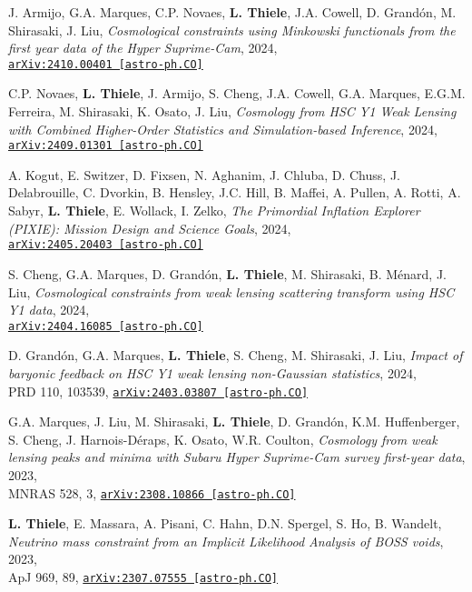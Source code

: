 J. Armijo, G.A. Marques, C.P. Novaes, {\bf L. Thiele}, J.A. Cowell, D. Grand\'on,
M. Shirasaki, J. Liu,
\emph{Cosmological constraints using Minkowski functionals from the first year
data of the Hyper Suprime-Cam}, 2024,\\
\href{https://arxiv.org/abs/2410.00401}{\mbox{\texttt{arXiv:2410.00401 [astro-ph.CO]}}}

C.P. Novaes, {\bf L. Thiele}, J. Armijo, S. Cheng, J.A. Cowell, G.A. Marques, E.G.M. Ferreira,
M. Shirasaki, K. Osato, J. Liu,
\emph{Cosmology from HSC Y1 Weak Lensing with Combined Higher-Order Statistics and
Simulation-based Inference}, 2024,\\
\href{https://arxiv.org/abs/2409.01301}{\mbox{\texttt{arXiv:2409.01301 [astro-ph.CO]}}}

A. Kogut, E. Switzer, D. Fixsen, N. Aghanim, J. Chluba, D. Chuss, J. Delabrouille,
C. Dvorkin, B. Hensley, J.C. Hill, B. Maffei, A. Pullen, A. Rotti, A. Sabyr,
{\bf L. Thiele}, E. Wollack, I. Zelko,
\emph{The Primordial Inflation Explorer (PIXIE): Mission Design and Science Goals}, 2024,\\
\href{https://arxiv.org/abs/2405.20403}{\mbox{\texttt{arXiv:2405.20403 [astro-ph.CO]}}}

S. Cheng, G.A. Marques, D. Grand\'on, {\bf L. Thiele}, M. Shirasaki, B. M\'enard, J. Liu,
\emph{Cosmological constraints from weak lensing scattering transform using HSC Y1 data}, 2024,\\
\href{https://arxiv.org/abs/2404.16085}{\mbox{\texttt{arXiv:2404.16085 [astro-ph.CO]}}}

D. Grand\'on, G.A. Marques, {\bf L. Thiele}, S. Cheng, M. Shirasaki, J. Liu,
\emph{Impact of baryonic feedback on HSC Y1 weak lensing non-Gaussian statistics}, 2024,\\
PRD 110, 103539,
\href{https://arxiv.org/abs/2403.03807}{\mbox{\texttt{arXiv:2403.03807 [astro-ph.CO]}}}

G.A. Marques, J. Liu, M. Shirasaki, {\bf L. Thiele}, D. Grand\'on, K.M. Huffenberger,
S. Cheng, J. Harnois-D\'eraps, K. Osato, W.R. Coulton,
\emph{Cosmology from weak lensing peaks and minima
      with Subaru Hyper Suprime-Cam survey first-year data}, 2023,\\
MNRAS 528, 3,
\href{https://arxiv.org/abs/2308.10866}{\mbox{\texttt{arXiv:2308.10866 [astro-ph.CO]}}}

{\bf L. Thiele}, E. Massara, A. Pisani, C. Hahn, D.N. Spergel, S. Ho, B. Wandelt,
\emph{Neutrino mass constraint from an Implicit Likelihood Analysis of BOSS voids}, 2023,\\
ApJ 969, 89,
\href{https://arxiv.org/abs/2307.07555}{\mbox{\texttt{arXiv:2307.07555 [astro-ph.CO]}}}

